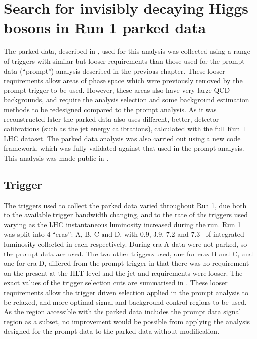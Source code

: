 \chapter{Search for invisibly decaying Higgs bosons in Run 1 parked data}
\label{chap:parked}
The parked data, described in , used for this analysis was collected using a range of triggers with similar but looser requirements than those used for the prompt data (``prompt'') analysis described in the previous chapter. These looser requirements allow areas of phase space which were previously removed by the prompt trigger to be used. However, these areas also have very large \ac{QCD} backgrounds, and require the analysis selection 
and some background estimation methods to be redesigned compared to the prompt analysis. As it was reconstructed later the parked data also uses different, better, detector calibrations (such as the jet energy calibrations), calculated with the full Run 1 LHC dataset. The parked data analysis was also carried out using a new code framework, which was fully validated against that used in the prompt analysis. This analysis was made public in .%


\section{Trigger}
\label{sec:parkedtrigger}
The triggers used to collect the parked data varied throughout Run 1, due both to the available trigger bandwidth changing, and to the rate of the triggers used varying as the LHC instantaneous luminosity increased during the run. Run 1 was split into 4 ``eras'': A, B, C and D, with 0.9, 3.9, 7.2 and 7.3 \invfb\, of integrated luminosity collected in each respectively. During era A data were not parked, so the prompt data are used. The two other triggers used, one for eras B and C, and one for era D, differed from the prompt trigger in that there was no requirement on the \MET present at the \ac{HLT} level and the jet \pt and \Mjj requirements were looser. The exact values of the trigger selection cuts are summarised in . These looser requirements allow the trigger driven selection applied in the prompt analysis to be relaxed, and more optimal signal and background control regions to be used. As the region accessible with the parked data includes the prompt data signal region as a subset, no improvement would be possible from applying the analysis designed for the prompt data to the parked data without modification. 

